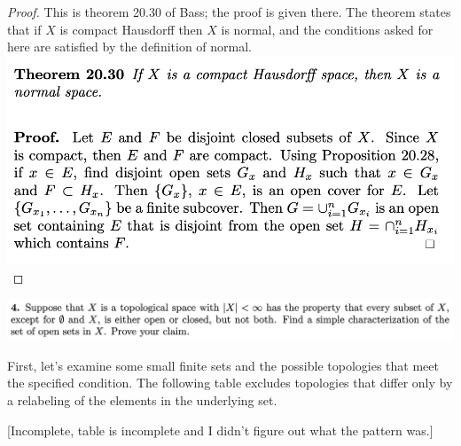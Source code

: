 \begin{proof}
  This is theorem 20.30 of Bass; the proof is given there. The theorem states that if $X$ is compact Hausdorff
  then $X$ is normal, and the conditions asked for here are satisfied by the definition of normal.\\
  \includegraphics[width=400pt]{img/analysis--berkeley-202a-hw13-7531.png}
\end{proof}


\newpage
\begin{mdframed}
\includegraphics[width=400pt]{img/analysis--berkeley-202a-hw13-9356.png}
\end{mdframed}

First, let's examine some small finite sets and the possible topologies that meet the specified condition. The
following table excludes topologies that differ only by a relabeling of the elements in the underlying set.

[Incomplete, table is incomplete and I didn't figure out what the pattern was.]

